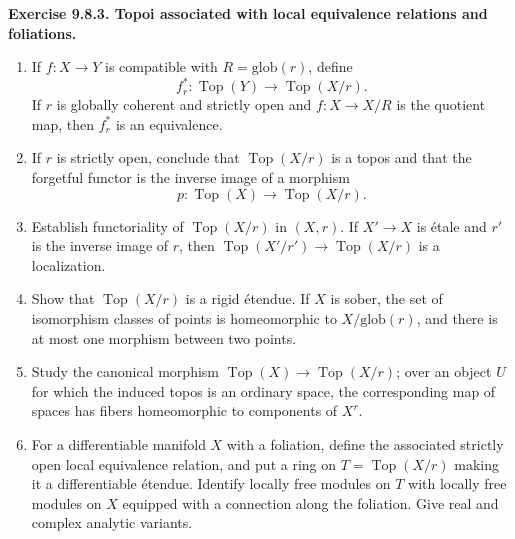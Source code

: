\documentclass[11pt]{article}
\newcommand{\Top}{\operatorname{Top}}
\newcommand{\glob}{\mathrm{glob}}
\newenvironment{remarktext}[1]{\par\medskip\noindent\textbf{#1.}\ }{\par\medskip}
\begin{document}
\begin{remarktext}{Exercise 9.8.3. Topoi associated with local equivalence relations and foliations}
\begin{enumerate}[label=\alph*)]
\item If \(f:X\to Y\) is compatible with \(R=\glob(r)\), define
\[
f_r^*:\Top(Y)\longrightarrow \Top(X/r).
\]
If \(r\) is globally coherent and strictly open and \(f:X\to X/R\) is the quotient map, then \(f_r^*\) is an equivalence.
\item If \(r\) is strictly open, conclude that \(\Top(X/r)\) is a topos and that the forgetful functor is the inverse image of a morphism
\[
p:\Top(X)\longrightarrow \Top(X/r).
\]
\item Establish functoriality of \(\Top(X/r)\) in \((X,r)\). If \(X'\to X\) is \'etale and \(r'\) is the inverse image of \(r\), then \(\Top(X'/r')\to\Top(X/r)\) is a localization.
\item Show that \(\Top(X/r)\) is a rigid \'etendue. If \(X\) is sober, the set of isomorphism classes of points is homeomorphic to \(X/\glob(r)\), and there is at most one morphism between two points.
\item Study the canonical morphism \(\Top(X)\to\Top(X/r)\); over an object \(U\) for which the induced topos is an ordinary space, the corresponding map of spaces has fibers homeomorphic to components of \(X^r\).
\item For a differentiable manifold \(X\) with a foliation, define the associated strictly open local equivalence relation, and put a ring on \(T=\Top(X/r)\) making it a differentiable \'etendue. Identify locally free modules on \(T\) with locally free modules on \(X\) equipped with a connection along the foliation. Give real and complex analytic variants.
\end{enumerate}
\end{remarktext}

\bigskip
\end{document}
